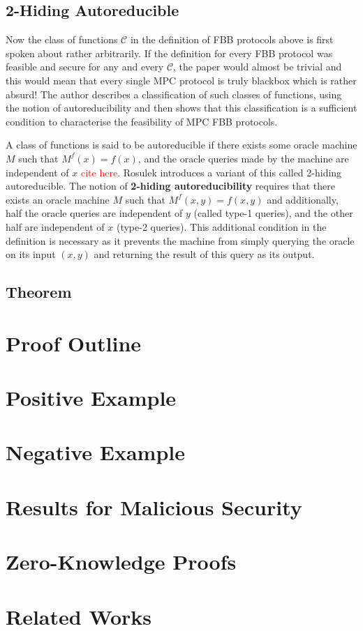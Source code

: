 \documentclass[11pt]{article}
\theoremstyle{theorem}
\theoremstyle{theorem}
\theoremstyle{remark}
\theoremstyle{note}
\theoremstyle{plain}
\theoremstyle{definition}
\begin{document}
\subsection{2-Hiding Autoreducible}
Now the class of functions $\mathcal{C}$ in the definition of FBB protocols above is first spoken about rather arbitrarily. If the definition for every FBB protocol was feasible and secure for any and every  $\mathcal{C}$, the paper would almost be trivial and this would mean that every single MPC protocol is truly blackbox which is rather absurd! The author describes a classification of such classes of functions, using the notion of autoreducibility and then shows that this classification is a sufficient condition to characterise the feasibility of MPC FBB protocols.

A class of functions is said to be autoreducible if there exists some oracle machine $M$ such that $M^{f}(x) = f(x)$, and the oracle queries made by the machine are independent of $x$ \textcolor{red}{cite here}. Rosulek introduces a variant of this called 2-hiding autoreducible. The notion of \textbf{2-hiding autoreducibility} requires that there exists an oracle machine $M$ such that $M^{f}(x,y) = f(x,y)$ and additionally, half the oracle queries are independent of $y$ (called type-1 queries), and the other half are independent of $x$ (type-2 queries). This additional condition in the definition is necessary as it prevents the machine from simply querying the oracle on its input $(x,y)$ and returning the result of this query as its output.

\subsection{Theorem}


\section{Proof Outline}

\section{Positive Example}

\section{Negative Example}

\section{Results for Malicious Security}

\section{Zero-Knowledge Proofs}

\section{Related Works}
\cite{C:IKPSY16}




\end{document}
